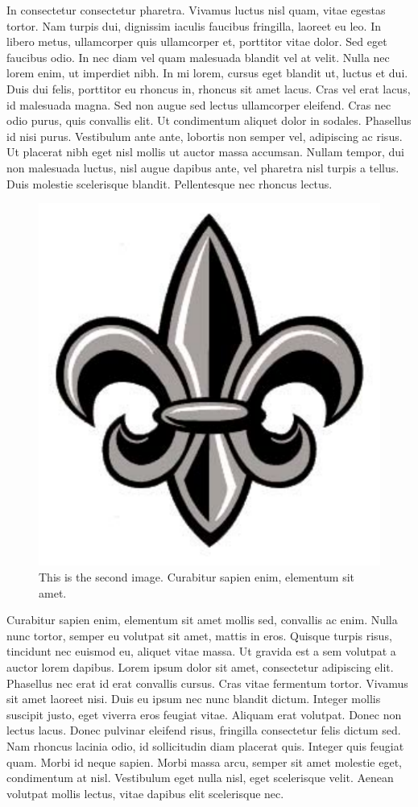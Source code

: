 \documentclass[12pt]{report}	%
\begin{document}
In consectetur consectetur pharetra. Vivamus luctus nisl quam, vitae
egestas tortor. Nam turpis dui, dignissim iaculis faucibus fringilla,
laoreet eu leo. In libero metus, ullamcorper quis ullamcorper et,
porttitor vitae dolor. Sed eget faucibus odio. In nec diam vel quam
malesuada blandit vel at velit. Nulla nec lorem enim, ut imperdiet
nibh. In mi lorem, cursus eget blandit ut, luctus et dui. Duis dui
felis, porttitor eu rhoncus in, rhoncus sit amet lacus. Cras vel erat
lacus, id malesuada magna. Sed non augue sed lectus ullamcorper
eleifend. Cras nec odio purus, quis convallis elit. Ut condimentum
aliquet dolor in sodales. Phasellus id nisi purus. Vestibulum ante ante,
lobortis non semper vel, adipiscing ac risus. Ut placerat nibh eget nisl
mollis ut auctor massa accumsan. Nullam tempor, dui non malesuada
luctus, nisl augue dapibus ante, vel pharetra nisl turpis a tellus. Duis
molestie scelerisque blandit. Pellentesque nec rhoncus lectus.
\begin{figure}[htb]
  \centering
  \includegraphics[draft=false,width=0.4\linewidth]{ull2.pdf}
  \caption{This is the second image. Curabitur sapien enim, elementum sit amet.}
  \label{fig:ull2}
\end{figure}
  
Curabitur sapien enim, elementum sit amet mollis sed, convallis ac
enim. Nulla nunc tortor, semper eu volutpat sit amet, mattis in
eros. Quisque turpis risus, tincidunt nec euismod eu, aliquet vitae
massa. Ut gravida est a sem volutpat a auctor lorem dapibus. Lorem ipsum
dolor sit amet, consectetur adipiscing elit. Phasellus nec erat id erat
convallis cursus. Cras vitae fermentum tortor. Vivamus sit amet laoreet
nisi. Duis eu ipsum nec nunc blandit dictum. Integer mollis suscipit
justo, eget viverra eros feugiat vitae. Aliquam erat volutpat. Donec non
lectus lacus. Donec pulvinar eleifend risus, fringilla consectetur felis
dictum sed. Nam rhoncus lacinia odio, id sollicitudin diam placerat
quis. Integer quis feugiat quam. Morbi id neque sapien. Morbi massa
arcu, semper sit amet molestie eget, condimentum at nisl. Vestibulum
eget nulla nisl, eget scelerisque velit. Aenean volutpat mollis lectus,
vitae dapibus elit scelerisque nec.
\end{document}
